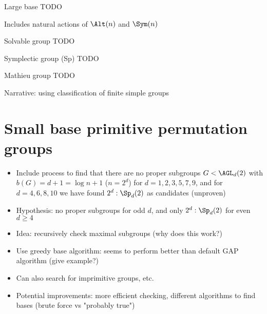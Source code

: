 \begin{definition}
    Large base TODO

    Includes natural actions of $\Alt(n)$ and $\Sym(n)$
\end{definition}

\begin{definition}
    Solvable group TODO
\end{definition}

\begin{definition}
    Symplectic group (Sp) TODO
\end{definition}

\begin{definition}
    Mathieu group TODO
\end{definition}

Narrative: using classification of finite simple groups

\section{Small base primitive permutation groups}

\begin{itemize}
    \item Include process to find that there are no proper subgroups $G < \AGL_d(2)$ with $b(G) = d + 1 = \log n + 1$ ($n = 2^d$) for $d = 1,2,3,5,7,9$, and for $d = 4,6,8,10$ we have found $2^d : \Sp_d(2)$ as candidates (unproven)
    \item Hypothesis: no proper subgroups for odd $d$, and only $2^d : \Sp_d(2)$ for even $d \geq 4$
    \item Idea: recursively check maximal subgroups (why does this work?)
    \item Use greedy base algorithm: seems to perform better than default GAP algorithm (give example?)
    \item Can also search for imprimitive groups, etc.
    \item Potential improvements: more efficient checking, different algorithms to find bases (brute force vs "probably true")
\end{itemize}